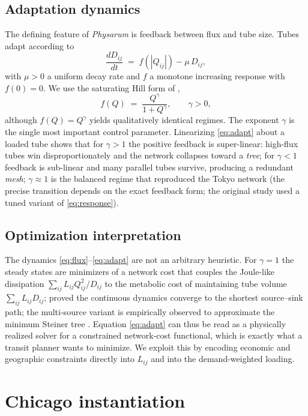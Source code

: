 \documentclass[11pt]{article}
\newcommand{\D}{D}
\begin{document}
\subsection{Adaptation dynamics}
The defining feature of \emph{Physarum} is feedback between flux and tube size. Tubes
adapt according to
\begin{equation}
\frac{d\D_{ij}}{dt} \;=\; f\!\left(|Q_{ij}|\right) - \mu\,\D_{ij},
\label{eq:adapt}
\end{equation}
with $\mu>0$ a uniform decay rate and $f$ a monotone increasing response with $f(0)=0$.
We use the saturating Hill form of \citet{tero2010},
\begin{equation}
f(Q) \;=\; \frac{Q^{\gamma}}{1+Q^{\gamma}}, \qquad \gamma>0,
\label{eq:response}
\end{equation}
although $f(Q)=Q^\gamma$ yields qualitatively identical regimes. The exponent $\gamma$ is
the single most important control parameter. Linearizing \eqref{eq:adapt} about a loaded
tube shows that for $\gamma>1$ the positive feedback is super-linear: high-flux tubes
win disproportionately and the network collapses toward a \emph{tree}; for $\gamma<1$
feedback is sub-linear and many parallel tubes survive, producing a redundant
\emph{mesh}; $\gamma\approx 1$ is the balanced regime that reproduced the Tokyo network (the precise
transition depends on the exact feedback form; the original study used a tuned variant of
\eqref{eq:response}).

\subsection{Optimization interpretation}
The dynamics \eqref{eq:flux}--\eqref{eq:adapt} are not an arbitrary heuristic. For
$\gamma=1$ the steady states are minimizers of a network cost that couples the Joule-like
dissipation $\sum_{ij} L_{ij} Q_{ij}^2/\D_{ij}$ to the metabolic cost of maintaining tube
volume $\sum_{ij} L_{ij}\D_{ij}$; \citet{bonifaci2012} proved the continuous dynamics
converge to the shortest source--sink path; the multi-source variant is empirically observed
to approximate the minimum Steiner tree \citep{sun2017}. Equation \eqref{eq:adapt} can thus be
read as a physically realized solver for a constrained network-cost functional, which is
exactly what a transit planner wants to minimize. We exploit this by encoding economic and
geographic constraints directly into $L_{ij}$ and into the demand-weighted loading.

\section{Chicago instantiation}
\end{document}
